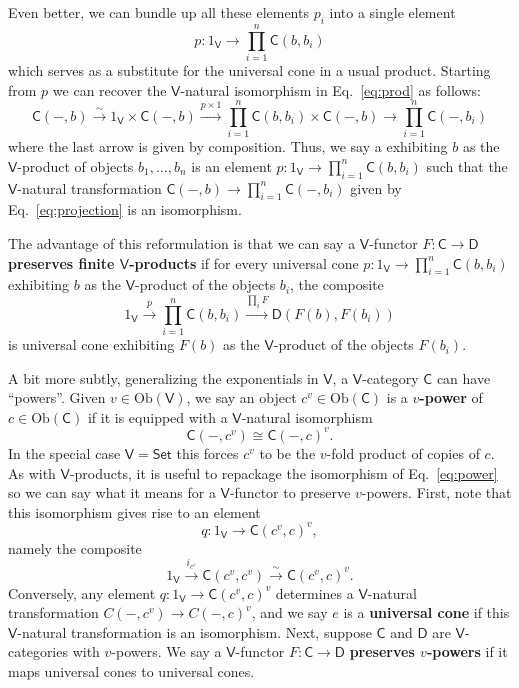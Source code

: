 \documentclass{amsart}
\newcommand{\define}[1]{{\bf \boldmath{#1}}}
\theoremstyle{definition}
\newcommand{\Set}{\mathsf{Set}}
\newcommand{\V}{\mathsf{V}}
\newcommand{\D}{\mathsf{D}}
\newcommand{\C}{\mathsf{C}}
\newcommand{\Obj}{\mathrm{Ob}}
\newcommand{\maps}{\colon}
\begin{document}
Even better, we can bundle up all these elements $p_i$ into a single element
\[    p \maps 1_\V \to \prod_{i=1}^n \C(b,b_i)  \]
which serves as a substitute for the universal cone in a usual product.  Starting from $p$ we can recover the $\V$-natural isomorphism in Eq.\ \eqref{eq:prod} as follows:
\begin{equation}
\label{eq:projection}    \C(-,b) \stackrel{\sim}{\longrightarrow} 1_\V \times \C(-,b)  
 \xrightarrow{p \times 1} \prod_{i=1}^n \C(b,b_i) \times \C(-,b) \longrightarrow \prod_{i=1}^n \C(-,b_i)
 \end{equation}
 where the last arrow is given by composition.   Thus, we say a \define{universal cone} exhibiting $b$ as the $\V$-product of objects $b_1, \dots, b_n$ is an element $p \maps 1_\V \to \prod_{i=1}^n \C(b,b_i)$ such that the $\V$-natural transformation $\C(-,b) \to \prod_{i=1}^n \C(-,b_i)$ given by Eq.\ \eqref{eq:projection} is an isomorphism.

The advantage of this reformulation is that we can say a $\V$-functor $F \maps \C \to \D$ \textbf{preserves finite $\V$-products} if for every universal cone $p \maps 1_\V \to \prod_{i=1}^n \C(b,b_i)$ exhibiting $b$ as the $\V$-product of the objects $b_i$, the composite
\[       1_\V \stackrel{p}{\longrightarrow} \prod_{i=1}^n \C(b,b_i) \xrightarrow{\prod_i F} \D(F(b),F(b_i)) \]
is universal cone exhibiting $F(b)$ as the $\V$-product of the objects $F(b_i)$.

A bit more subtly, generalizing the exponentials in $\V$, a $\V$-category $\C$ can have ``powers''.    Given $v \in \Obj(\V)$, we say an object $c^v \in \Obj(\C)$ is a \textbf{$v$-power} of $c \in \Obj(\C)$ if it is equipped with a $\V$-natural isomorphism
\begin{equation}
\label{eq:power}
 \C(-,c^v) \cong \C(-,c)^v.
\end{equation}
In the special case $\V = \Set$  this forces $c^v$ to be the $v$-fold product of copies of $c$.  %
As with $\V$-products, it is useful to repackage the isomorphism of Eq.\ \eqref{eq:power} so we can say what it means for a $\V$-functor to preserve $v$-powers.   First, note that this isomorphism gives rise to an element 
\[     q \maps 1_\V \to  \C(c^v,c)^v , \]
namely the composite
\[ 1_\V \stackrel{i_{c^v}}{\longrightarrow}  \C(c^v,c^v) \stackrel{\sim}{\longrightarrow} \C(c^v,c)^v .\]
Conversely, any element $q \maps 1_\V \to  \C(c^v,c)^v$ determines a $\V$-natural transformation $C(-,c^v) \to C(-,c)^v$, and we say $e$ is a \textbf{universal cone} if this $\V$-natural transformation is an isomorphism.  Next, suppose $\C$ and $\D$ are $\V$-categories with $v$-powers.  We say a $\V$-functor $F\maps \C\to \D$ \textbf{preserves $v$-powers} if it maps universal cones to universal cones.
\end{document}
